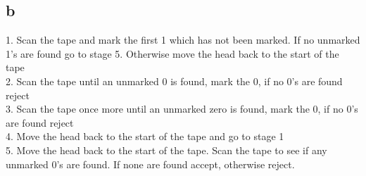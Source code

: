 \documentclass{scrartcl}
\begin{document}
\subsection*{b}
1. Scan the tape and mark the first 1 which has not been marked. If no unmarked 1’s are
found go to stage 5. Otherwise move the head back to the start of the tape\\
2. Scan the tape until an unmarked 0 is found, mark the 0, if no 0’s are found reject\\
3. Scan the tape once more until an unmarked zero is found, mark the 0, if no 0’s are found
reject\\
4. Move the head back to the start of the tape and go to stage 1\\
5. Move the head back to the start of the tape. Scan the tape to see if any unmarked 0’s are
found. If none are found accept, otherwise reject.
\end{document}
